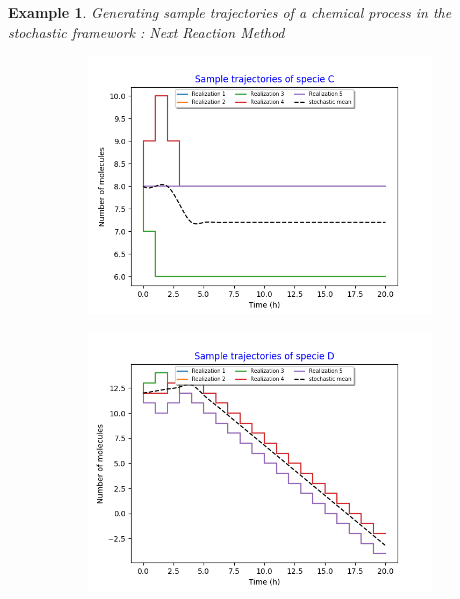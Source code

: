 \documentclass[11pt,a4paper]{article}
\newtheorem{example}[theorem]{Example}
\begin{document}
\begin{example}{Generating sample trajectories of a chemical process in the stochastic framework : Next Reaction Method}
\begin{figure}[H]
    \centering
    \begin{subfigure}{.5\textwidth}
      \centering
        \includegraphics[width=1.1\linewidth]{Images/c.png}
        \label{fig: Single sample trajectory}
    \end{subfigure}%
    \begin{subfigure}{.5\textwidth}
      \centering
        \includegraphics[width=1.1\linewidth]{Images/d.png}
        \label{fig: Single sample trajectory}
    \end{subfigure}
    \centering
    \begin{subfigure}{.5\textwidth}
      \centering

\end{subfigure}
\end{figure}
\end{example}
\end{document}
